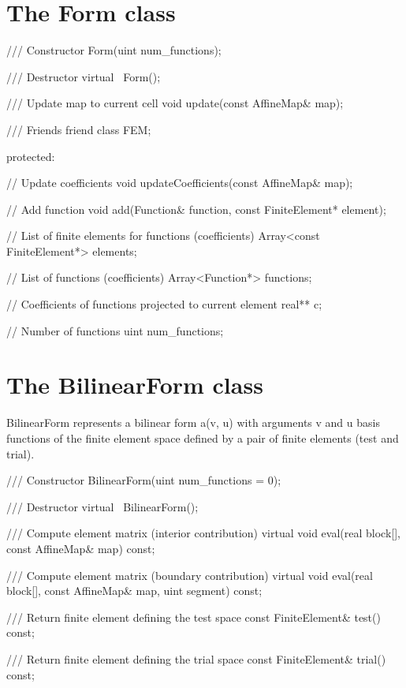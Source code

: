 \section{The Form class}

    /// Constructor
    Form(uint num_functions);

    /// Destructor
    virtual ~Form();

    /// Update map to current cell
    void update(const AffineMap& map);

    /// Friends
    friend class FEM;

  protected:

    // Update coefficients
    void updateCoefficients(const AffineMap& map);

    // Add function
    void add(Function& function, const FiniteElement* element);

    // List of finite elements for functions (coefficients)
    Array<const FiniteElement*> elements;

    // List of functions (coefficients)
    Array<Function*> functions;
    
    // Coefficients of functions projected to current element
    real** c;

    // Number of functions
    uint num_functions;



\section{The BilinearForm class}

BilinearForm represents a bilinear form a(v, u) with arguments v
and u basis functions of the finite element space defined by a
pair of finite elements (test and trial).

    /// Constructor
    BilinearForm(uint num_functions = 0);
    
    /// Destructor
    virtual ~BilinearForm();
    
    /// Compute element matrix (interior contribution)
    virtual void eval(real block[], const AffineMap& map) const;
    
    /// Compute element matrix (boundary contribution)
    virtual void eval(real block[], const AffineMap& map, uint segment) const;

    /// Return finite element defining the test space
    const FiniteElement& test() const;

    /// Return finite element defining the trial space
    const FiniteElement& trial() const;

